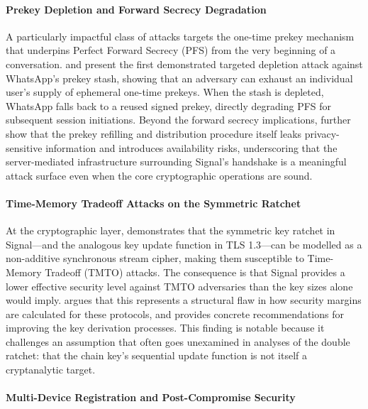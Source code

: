 \paragraph{Prekey Depletion and Forward Secrecy Degradation}

A particularly impactful class of attacks targets the one-time prekey mechanism that underpins Perfect Forward Secrecy (PFS) from the very beginning of a conversation. \textcite{gegenhuber2025} and \textcite{gegenhuber2025b} present the first demonstrated targeted depletion attack against WhatsApp's prekey stash, showing that an adversary can exhaust an individual user's supply of ephemeral one-time prekeys. When the stash is depleted, WhatsApp falls back to a reused signed prekey, directly degrading PFS for subsequent session initiations. Beyond the forward secrecy implications, \textcite{gegenhuber2025} further show that the prekey refilling and distribution procedure itself leaks privacy-sensitive information and introduces availability risks, underscoring that the server-mediated infrastructure surrounding Signal's handshake is a meaningful attack surface even when the core cryptographic operations are sound.

\paragraph{Time-Memory Tradeoff Attacks on the Symmetric Ratchet}

At the cryptographic layer, \textcite{mattsson2023} demonstrates that the symmetric key ratchet in Signal—and the analogous key update function in TLS 1.3—can be modelled as a non-additive synchronous stream cipher, making them susceptible to Time-Memory Tradeoff (TMTO) attacks. The consequence is that Signal provides a lower effective security level against TMTO adversaries than the key sizes alone would imply. \textcite{mattsson2023} argues that this represents a structural flaw in how security margins are calculated for these protocols, and provides concrete recommendations for improving the key derivation processes. This finding is notable because it challenges an assumption that often goes unexamined in analyses of the double ratchet: that the chain key's sequential update function is not itself a cryptanalytic target.

\paragraph{Multi-Device Registration and Post-Compromise Security}

